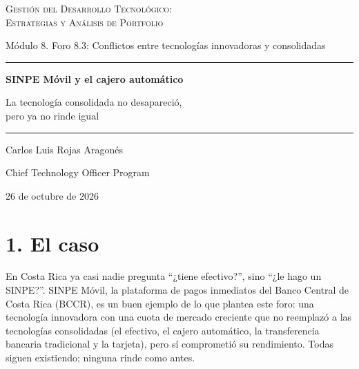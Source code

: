\documentclass[11pt,letterpaper]{article}
\begin{document}
\begin{titlepage}
\centering
\vspace*{3.2cm}
{\large\scshape Gestión del Desarrollo Tecnológico:\\
Estrategias y Análisis de Portfolio\par}
\vspace{0.5cm}
{\normalsize Módulo 8. Foro 8.3: Conflictos entre tecnologías innovadoras y consolidadas\par}
\vspace{2.6cm}
{\color{cEje}\rule{0.55\textwidth}{0.8pt}\par}
\vspace{0.7cm}
{\LARGE\bfseries SINPE Móvil y el cajero automático\par}
\vspace{0.5cm}
{\large La tecnología consolidada no desapareció,\\
pero ya no rinde igual\par}
\vspace{0.7cm}
{\color{cEje}\rule{0.55\textwidth}{0.8pt}\par}
\vfill
{\large Carlos Luis Rojas Aragonés\par}
\vspace{0.3cm}
{\normalsize Chief Technology Officer Program\par}
\vspace{0.3cm}
{\normalsize 26 de octubre de 2026\par}
\vspace*{1.5cm}
\end{titlepage}

\section*{1. El caso}

En Costa Rica ya casi nadie pregunta \enquote{¿tiene efectivo?}, sino
\enquote{¿le hago un SINPE?}. SINPE Móvil, la plataforma de pagos inmediatos del
Banco Central de Costa Rica (BCCR), es un buen ejemplo de lo que plantea este
foro: una tecnología innovadora con una cuota de mercado creciente que no
reemplazó a las tecnologías consolidadas (el efectivo, el cajero automático, la
transferencia bancaria tradicional y la tarjeta), pero sí comprometió su
rendimiento. Todas siguen existiendo; ninguna rinde como antes.
\end{document}
